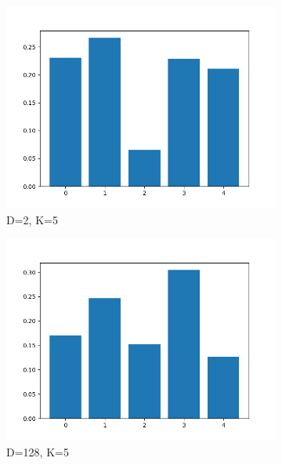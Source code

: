 \documentclass[conference]{IEEEtran}
\begin{document}
\begin{figure}[H]
    \centering
    \begin{subfigure}[b]{.5\linewidth}
        \centering
        \includegraphics[width=1\linewidth]{images/eval/weights_BGMM_d2_k5.png}
        \caption{D=2, K=5}
        \label{fig:dblp_weights_d2_k5}
    \end{subfigure}%
    \begin{subfigure}[b]{.5\linewidth}
        \centering
        \includegraphics[width=1\linewidth]{images/eval/weights_BGMM_d128_k5.png}
        \caption{D=128, K=5}
        \label{fig:dblp_weights_d128_k5}
    \end{subfigure}
    \begin{subfigure}[b]{.5\linewidth}

\end{subfigure}
\end{figure}
\end{document}
